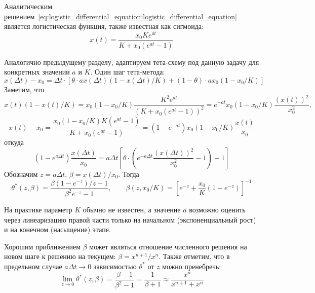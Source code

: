 Аналитическим решением~\eqref{eq:logistic_differential_equation:logistic_differential_equation}
является логистическая функция, также известная как сигмоида:
\begin{equation}
    \label{eq:logistic_differential_equation:logistic_function}
    x(t) = \frac{x_0 K e^{a t}}{K + x_0 (e^{a t} - 1)}
\end{equation}


Аналогично предыдущему разделу, адаптируем тета-схему под данную задачу для конкретных значении $ a $ и $ K $.
Один шаг тета-метода:
\[
    x(\Delta t) - x_0 = \Delta t \cdot \left[ \theta \cdot a x(\Delta t) (1 - x(\Delta t) / K) + (1 - \theta) \cdot a x_0 (1 - x_0 / K) \right]
\]
Заметим, что
\[
    x(t) (1 - x(t) / K) = x_0 (1 - x_0 / K) \frac{K^2 e^{a t}}{(K + x_0 (e^{a t} - 1))^2} = e^{-a t} x_0 (1 - x_0 / K) \frac{(x(t))^2}{x_0^2},
\]
\[
    x(t) - x_0 = \frac{x_0 (1 - x_0 / K) K (e^{a t} - 1)}{K + x_0 (e^{a t} - 1)} = (1 - e^{- a t}) x_0 (1 - x_0 / K) \frac{x(t)}{x_0}
\]
откуда
\[
    (1 - e^{a \Delta t}) \frac{x(\Delta t)}{x_0} =
    a \Delta t \left[ \theta \cdot \left( e^{- a \Delta t} \frac{(x(\Delta t))^2}{x_0^2}  - 1 \right) + 1 \right]
\]
Обозначим $ z = a \Delta t $, $ \beta = x(\Delta t) / x_0 $.
Тогда
\begin{equation}
    \label{eq:logistic_differential_equation:optimal_theta}
    \theta^*(z, \beta) = \frac{\beta (1 - e^{-z}) / z - 1}{\beta^2 e^{-z} - 1}, \qquad \beta(z, x_0/K) = \left[ e^{-z} + \frac{x_0}{K} (1 - e^{-z}) \right]^{-1}
\end{equation}

На практике параметр $ K $ обычно не известен,
а значение $ a $ возможно оценить через линеаризацию правой части только
на начальном (экспоненциальный рост) и на конечном (насыщение) этапе.

Хорошим приближением $ \beta $ может являться отношение численного решения на новом шаге
к решению на текущем: $ \beta = x^{n+1} / x^n $.
Также отметим, что в предельном случае $ a \Delta t \to 0 $ зависимостью $ \theta^* $ от $ z $ можно пренебречь:
\[
    \lim_{z \to 0} \theta^*(z, \beta) = \frac{\beta - 1}{\beta^2 - 1} = \frac{1}{\beta + 1} \approx \frac{x^n}{x^{n+1} + x^{n}}
\]



